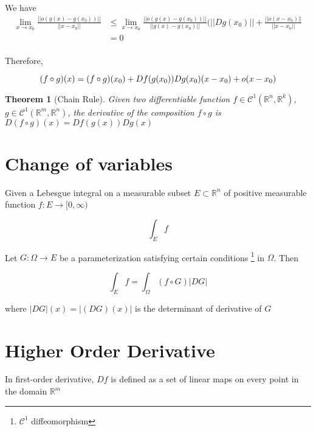 \documentclass{article}
\newtheorem{theorem}{Theorem}
\begin{document}
We have
\begin{align*}
    \lim_{x \to x_0} \frac{||o(g(x) - g(x_0))||}{||x - x_0||}  &\leq \lim_{x \to x_0} \frac{||o(g(x) - g(x_0))||}{||g(x)- g(x_0)||} ( ||Dg(x_0)|| + \frac{||o(x - x_0)||}{||x - x_0||} \\
                                                                    &= 0 \\
\end{align*}

Therefore,

\begin{equation}
    (f \circ g)(x) = (f \circ g)(x_0) + Df(g(x_0)) Dg(x_0)(x - x_0) + o(x - x_0) \\
\end{equation}

\begin{theorem} [Chain Rule]
Given two differentiable function $f \in \mathcal{C}^1(\mathbb{R}^n, \mathbb{R}^k)$, $g \in \mathcal{C}^1(\mathbb{R}^m, \mathbb{R}^n)$, the derivative of the composition $f \circ g$ is $D(f \circ g)(x) = Df(g(x)) Dg(x)$
\end{theorem}

\section{Change of variables}

Given a Lebesgue integral on a measurable subset $E \subset \mathbb{R}^n$ of positive measurable function $f: E \to [0, \infty)$ 

\begin{equation}
    \int_{E} f
\end{equation}

Let $G: \Omega \to E$ be a parameterization satisfying certain conditions \footnote{$\mathcal{C}^1$ diffeomorphism} in $\Omega$. Then

\begin{equation}
    \int_{E} f = \int_{\Omega} (f \circ G) |DG|
\end{equation}

where $|DG|(x) = |(DG)(x)|$ is the determinant of derivative of $G$

\section{Higher Order Derivative}

In first-order derivative, $Df$ is defined as a set of linear maps on every point in the domain $\mathbb{R}^m$
\end{document}

